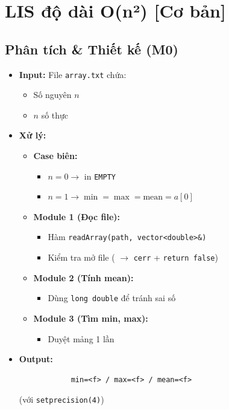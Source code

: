 \section{LIS độ dài O(n²) [Cơ bản]}
\subsection{Phân tích \& Thiết kế (M0)}
    \begin{itemize}
    \item \textbf{Input:}
    File \texttt{array.txt} chứa:
    \begin{itemize}
        \item Số nguyên $n$
        \item $n$ số thực
    \end{itemize}

    \item \textbf{Xử lý:}
        \begin{itemize}
            \item \textbf{Case biên:}
            \begin{itemize}
                \item $n = 0 \rightarrow$ in \texttt{EMPTY}
                \item $n = 1 \rightarrow \min = \max = \text{mean} = a[0]$
            \end{itemize}
            
            \item \textbf{Module 1 (Đọc file):}
            \begin{itemize}
                \item Hàm \texttt{readArray(path, vector<double>\&)}
                \item Kiểm tra mở file ( $\rightarrow$ \texttt{cerr} + \texttt{return false})
            \end{itemize}
            
            \item \textbf{Module 2 (Tính mean):}
            \begin{itemize}
                \item Dùng \texttt{long double} để tránh sai số
            \end{itemize}
            
            \item \textbf{Module 3 (Tìm min, max):}
            \begin{itemize}
                \item Duyệt mảng 1 lần
            \end{itemize}
        \end{itemize}

        \item \textbf{Output:}
        \begin{lstlisting}
            min=<f> / max=<f> / mean=<f>\end{lstlisting} 
        (với \texttt{setprecision(4)})
    \end{itemize}

